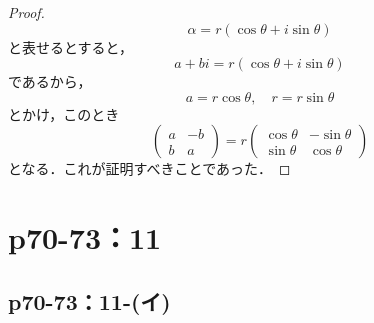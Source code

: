 \documentclass[a4paper,10pt,fleqn]{ltjsarticle}
\begin{document}
\begin{tleftbar}
    \begin{proof}
        \[
            \alpha = r (\cos \theta + i \sin \theta)
        \]
        と表せるとすると，
        \[
            a+bi = r (\cos \theta + i \sin \theta )
        \]
        であるから，
        \[
            a= r \cos \theta , \quad r = r \sin \theta
        \]
        とかけ，このとき
        \[
            \begin{pmatrix} a & -b \\ b & a \end{pmatrix} = r \begin{pmatrix} \cos \theta & -\sin \theta \\ \sin \theta & \cos \theta \end{pmatrix}
        \]
        となる．これが証明すべきことであった．
    \end{proof}
\end{tleftbar}

\newpage

\section*{p70-73：11}

\subsection*{p70-73：11-(イ)}
\end{document}

